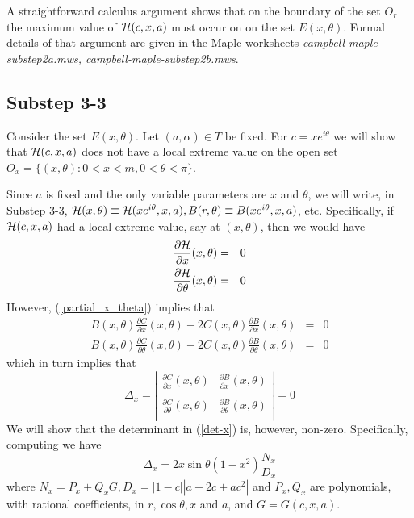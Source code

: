 \documentclass[12pt]{article}
\begin{document}
\vspace{0.05in}

A straightforward calculus argument shows that on the boundary of the set $O_r$ 
the maximum value of ${\cal H}(c,x,a)$ must occur on on the set $E(x,\theta)$. 
Formal details of that argument are given in the Maple worksheets {\em campbell-maple-substep2a.mws, 
campbell-maple-substep2b.mws}.

\vspace{0.05in}

\subsection{Substep 3-3} Consider the set $E(x,\theta)$.  Let $(a,\alpha) \in T$ be fixed.  
For $c = xe^{i\theta}$ we will show that ${\cal H}(c,x,a)$ does not have a local extreme 
value on the open set $O_x = \{(x,\theta) : 0 < x < m, 0 < \theta < \pi \}$.  


Since $a$ is fixed and the only variable parameters are $x$ and $\theta$, we will write, in Substep 3-3, ${\cal H}(x,\theta) \equiv {\cal H}(xe^{i\theta},x,a), {B}(r,\theta) \equiv {B}(xe^{i\theta},x,a)$, etc. Specifically, if ${\cal H}(c,x,a)$ had a local extreme value, say at $(x,\theta)$, then
we would have 
\begin{eqnarray} \label{partial_x_theta}
\frac{\partial {\cal H}}{\partial x}{(x,\theta)} &=& 0 \\ \nonumber
\frac{\partial {\cal H}}{\partial \theta}{(x,\theta)} &=& 0
\end{eqnarray}
However, (\ref{partial_x_theta}) implies that 
\begin{eqnarray*} 
B(x,\theta)\frac{\partial {C}}{\partial x}{(x,\theta)} - 2C(x,\theta)\frac{\partial {B}}{\partial x}{(x,\theta)}&=& 0 \\ \nonumber
B(x,\theta)\frac{\partial {C}}{\partial \theta}{(x,\theta)} - 2C(x,\theta)\frac{\partial {B}}{\partial \theta}{(x,\theta)}&=& 0 
\end{eqnarray*}
which in turn implies that 
\begin{equation} \label{det-x}
\Delta_x = 
\left |
\begin{array}{ll}
\frac{\partial {C}}{\partial x}{(x,\theta)} & \frac{\partial {B}}{\partial x}{(x,\theta)} \\
& \\
\frac{\partial {C}}{\partial \theta}{(x,\theta)} & \frac{\partial {B}}{\partial \theta}{(x,\theta)} \\
\end{array}
\right | = 0
\end{equation}
\vspace{0.05in}
We will show that the determinant in (\ref{det-x}) is, however, non-zero.  Specifically, computing we have
$$
\Delta_x = 2 x \sin \theta (1-x^2) \frac{N_x}{D_x} 
$$
where $N_x = P_x + Q_x G, D_x = |1-c| |a+2c+ac^2|$
and $P_x, Q_x$ are polynomials, with rational coefficients, in $r, \cos \theta, x$ and $a$, and $G = G(c,x,a)$.
\end{document}

